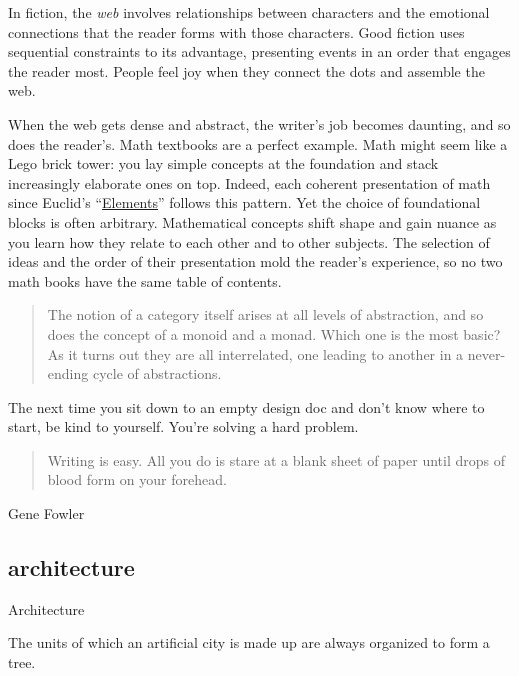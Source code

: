 \documentclass{article}
\begin{document}
In fiction, the \emph{web} involves relationships between characters
and the emotional connections that the reader forms with those characters.
Good fiction uses sequential constraints to its advantage,
presenting events in an order that engages the reader most.
People feel joy when they connect the dots and assemble the web.

When the web gets dense and abstract,
the writer's job becomes daunting,
and so does the reader's.
Math textbooks are a perfect example.
Math might seem like a Lego brick tower:
you lay simple concepts at the foundation
and stack increasingly elaborate ones on top.
Indeed, each coherent presentation of math since Euclid's ``\href{https://en.wikipedia.org/wiki/Euclid%27s_Elements}{Elements}'' follows this pattern.
Yet the choice of foundational blocks is often arbitrary.
Mathematical concepts shift shape and gain nuance as you learn how they relate to each other and to other subjects.
The selection of ideas and the order of their presentation mold the reader's experience,
so no two math books have the same table of contents.

\blockquote{
  The notion of a category itself arises at all levels of abstraction,
  and so does the concept of a monoid and a monad.
  Which one is the most basic?
  As it turns out they are all interrelated,
  one leading to another in a never-ending cycle of abstractions.
}{}

The next time you sit down to an empty design doc and don't know where to start,
be kind to yourself.
You're solving a hard problem.

\blockquote{
  Writing is easy.
  All you do is stare at a blank sheet of paper
  until drops of blood form on your forehead.
}{Gene Fowler}

\subsection{architecture}{Architecture}
\epigraph{
  The units of which an artificial city is made up
  are always organized to form a tree.
}{}
\end{document}
